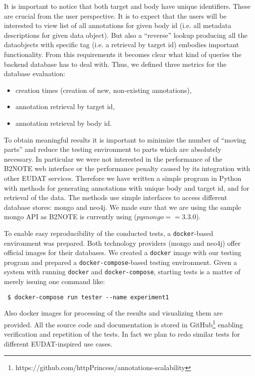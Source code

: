 \documentclass[a4paper,10pt]{article}
\begin{document}
It is important to notice that both target and body have unique identifiers. 
These are crucial from the user perspective. It is to expect that the users will 
be interested to view list of all annotations for given body id (i.e. all 
metadata descriptions for given data object). But also a ``reverse'' lookup 
producing all the dataobjects with specific tag (i.e. a retrieval by target id) 
embodies important functionality. From this requirements it becomes clear what 
kind of queries the backend database has to deal with. Thus, we defined three 
metrics for the database evaluation:
\begin{itemize}
 \item creation times (creation of new, non-existing annotations),
 \item annotation retrieval by target id,
 \item annotation retrieval by body id.
\end{itemize}

To obtain meaningful results it is important to minimize the number of ``moving 
parts'' and reduce the testing environment to parts which are absolutely 
necessary. In particular we were not interested in the performance of the B2NOTE 
web interface or the performance penalty caused by its integration with other EUDAT 
services. Therefore we have written a simple program in Python with methods 
for generating annotations with unique body and target id, and for retrieval
of the data. The methods use simple interfaces to access different database
stores: mongo and neo4j. We made sure that we are using the sample mongo API 
as B2NOTE is currently using ($pymongo==3.3.0$). 

To enable easy reproducibility of the conducted tests, a \texttt{docker}-based 
environment was prepared. Both technology providers (mongo and neo4j) offer 
official images for their databases. We created a \texttt{docker} image with our 
testing program and prepared a \texttt{docker-compose}-based testing 
environment. Given a system with running \texttt{docker} and 
\texttt{docker-compose}, starting tests is a matter of merely issuing one 
command like: 
\begin{verbatim}
 $ docker-compose run tester --name experiment1 
\end{verbatim}

Also docker images for processing of the results and visualizing them are 
provided. All the source code and documentation is stored in 
GitHub\footnote{https://github.com/httpPrincess/annotations-scalability} 
enabling verification and repetition of the tests. In fact we plan to 
redo similar tests for different EUDAT-inspired use cases. 
\end{document}
